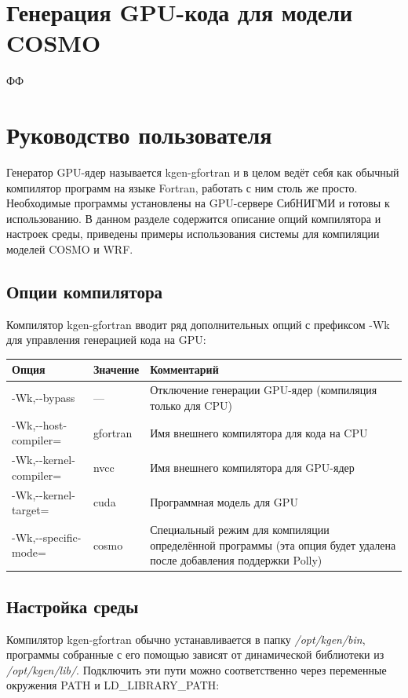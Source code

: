 \documentclass[a4,12pt]{report}
\begin{document}
\chapter{Генерация GPU-кода для модели COSMO}

ФФ

\chapter{Руководство пользователя}

Генератор GPU-ядер называется kgen-gfortran и в целом ведёт себя как обычный компилятор программ на языке Fortran, работать с ним столь же просто. Необходимые программы установлены на GPU-сервере СибНИГМИ и готовы к использованию. В данном разделе содержится описание опций компилятора и настроек среды, приведены примеры использования системы для компиляции моделей COSMO и WRF.

\section{Опции компилятора}

Компилятор kgen-gfortran вводит ряд дополнительных опций с префиксом -Wk для управления генерацией кода на GPU:

\vspace{15pt}
\begin{tabular}[h]{|l|l|p{7cm}|}
\hline
Опция & Значение & Комментарий \\ \hline \hline
-Wk,-\--bypass & --- & Отключение генерации GPU-ядер (компиляция только для CPU) \\ \hline
-Wk,-\--host-compiler= & gfortran & Имя внешнего компилятора для кода на CPU \\ \hline
-Wk,-\--kernel-compiler= & nvcc & Имя внешнего компилятора для GPU-ядер \\ \hline
-Wk,-\--kernel-target= & cuda & Программная модель для GPU \\ \hline
-Wk,-\--specific-mode= & cosmo & Специальный режим для компиляции определённой программы (эта опция будет удалена после добавления поддержки Polly) \\ \hline
\end{tabular}

\section{Настройка среды}

Компилятор kgen-gfortran обычно устанавливается в папку \emph{/opt/kgen/bin}, программы собранные с его помощью зависят от динамической библиотеки из \emph{/opt/kgen/lib/}. Подключить эти пути можно соответственно через переменные окружения PATH и LD\_LIBRARY\_PATH:
\end{document}
